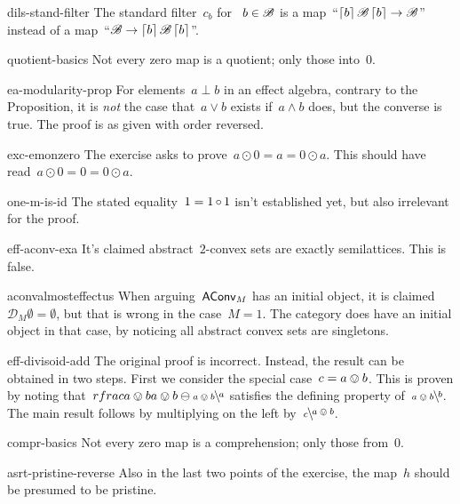 \begin{erratum}{dils-stand-filter}%
The standard filter~$c_b$ for ~$b \in \mathscr{B}$
    is a map~``$\left\lceil b\right\rceil \mathscr{B} \left\lceil b\right\rceil \to \mathscr{B}$''
    instead of a map~``$\mathscr{B} \to \left\lceil b\right\rceil \mathscr{B} \left\lceil b\right\rceil$''.
\end{erratum}
\begin{erratum}{quotient-basics}%
Not every zero map is a quotient; only those into~$0$.
\end{erratum}
\begin{erratum}{ea-modularity-prop}%
For elements~$a \perp b$ in an effect algebra,
    contrary to the Proposition,
    it is \emph{not} the case
    that~$a \vee b$ exists if~$a \wedge b$ does,
    but the converse is true.
The proof is as given with order reversed.
\end{erratum}
\begin{erratum}{exc-emonzero}%
The exercise asks to prove~$a \odot 0 = a = 0 \odot a$.
This should have read~$a \odot 0 = 0 = 0 \odot a$.
\end{erratum}
\begin{erratum}{one-m-is-id}%
The stated equality~$1 = 1 \mathop{\circ} 1$ isn't established yet,
    but also irrelevant for the proof.
\end{erratum}
\begin{erratum}{eff-aconv-exa}%
It's claimed abstract~$2$-convex sets are exactly semilattices.
This is false.
\end{erratum}
\begin{erratum}{aconvalmosteffectus}%
When arguing~$\mathsf{AConv}_M$ has an initial object,
    it is claimed~$\mathcal{D}_M \emptyset = \emptyset$,
    but that is wrong in the case~$M=1$.
The category does have an initial object in that case,
    by noticing all abstract convex sets are singletons.
\end{erratum}
\begin{erratum}{eff-divisoid-add}%
The original proof is incorrect. Instead, the result can be obtained in
    two steps. First we consider the special case~$c = a\ovee b$.
    This is proven by noting
        that~$rfrac{a \ovee b}{a \ovee b} \ominus \rfrac{a}{a \ovee b}$
    satisfies the defining property of~$\rfrac{b}{a \ovee b}$.
The main result follows by multiplying on
    the left by~$\rfrac{a \ovee b}{c}$.
\end{erratum}
\begin{erratum}{compr-basics}%
Not every zero map is a comprehension; only those from~$0$.
\end{erratum}
\begin{erratum}{asrt-pristine-reverse}%
Also in the last two points of the exercise,
    the map~$h$ should be presumed to be pristine.
\end{erratum}
